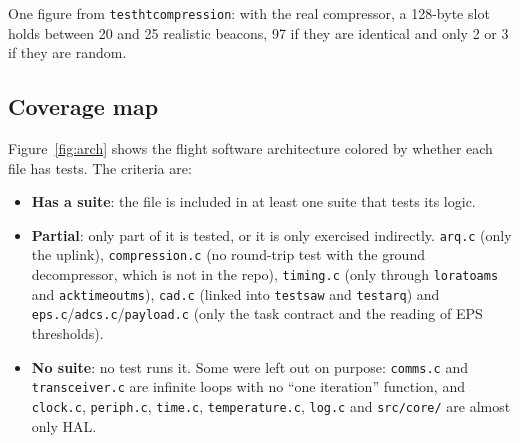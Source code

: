 \documentclass[11pt,a4paper]{article}
\DeclareRobustCommand{\_}{\textunderscore\allowbreak}
\newcommand{\cd}[1]{\texttt{#1}}
\begin{document}
One figure from \cd{test\_ht\_compression}: with the real compressor, a 128-byte slot holds
between 20 and 25 realistic beacons, 97 if they are identical and only 2 or 3 if they are
random.

\subsection{Coverage map}

Figure~\ref{fig:arch} shows the flight software architecture colored by whether each
file has tests. The criteria are:
\begin{itemize}
\item \textbf{Has a suite}: the file is included in at least one suite that tests its logic.
\item \textbf{Partial}: only part of it is tested, or it is only exercised indirectly.
  \cd{arq.c} (only the uplink), \cd{compression.c} (no round-trip test with the ground
  decompressor, which is not in the repo), \cd{timing.c} (only through \cd{lora\_toa\_ms} and
  \cd{ack\_timeout\_ms}), \cd{cad.c} (linked into \cd{test\_saw} and \cd{test\_arq}) and
  \cd{eps.c}/\cd{adcs.c}/\cd{payload.c} (only the task contract and the reading of EPS thresholds).
\item \textbf{No suite}: no test runs it. Some were left out on purpose:
  \cd{comms.c} and \cd{transceiver.c} are infinite loops with no ``one iteration'' function, and
  \cd{clock.c}, \cd{periph.c}, \cd{time.c}, \cd{temperature.c}, \cd{log.c} and \cd{src/core/} are
  almost only HAL.
\end{itemize}
\end{document}
